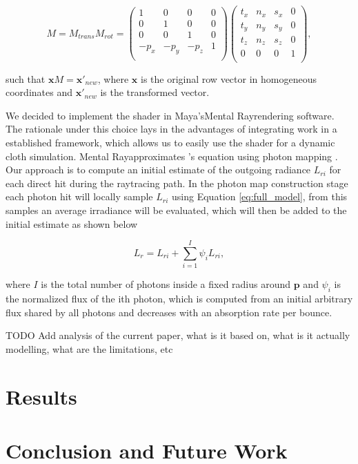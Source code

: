 \documentclass[12pt]{article}
\begin{document}
\begin{equation}
M = M_{trans}M_{rot} =
\begin{pmatrix}
1 & 0 & 0 & 0 \\
0 & 1 & 0 & 0 \\
0 & 0 & 1 & 0 \\
-p_x & -p_y & -p_z & 1 \\
\end{pmatrix}
\begin{pmatrix}
t_x & n_x & s_x & 0 \\
t_y & n_y & s_y & 0 \\
t_z & n_z & s_z & 0 \\
0 & 0 & 0 & 1 \\
\end{pmatrix},
\end{equation}

such that $\mathbf{x}M=\mathbf{x}'_{new}$, where $\mathbf{x}$ is the original row vector in homogeneous coordinates and $\mathbf{x}'_{new}$ is the transformed vector.

We decided to implement the shader in Maya's\texttrademark Mental Ray\texttrademark rendering software.
The rationale under this choice lays in the advantages of integrating work in a established framework, which allows us to easily use the shader for a dynamic cloth simulation.
Mental Ray\texttrademark approximates \citeauthor{Kajiya1986}'s equation \cite{Kajiya1986} using photon mapping \cite{Jensen1996}.
Our approach is to compute an initial estimate of the outgoing radiance $L_{ri}$ for each direct hit during the raytracing path.
In the photon map construction stage each photon hit will locally sample $L_{ri}$ using Equation \ref{eq:full_model}, from this samples an average irradiance will be evaluated, which will then be added to the initial estimate as shown below

\begin{equation}
L_r = L_{ri} + \sum_{i = 1}^{I} \psi_i L_{ri},
\end{equation}

where $I$ is the total number of photons inside a fixed radius around $\mathbf{p}$ and $\psi_i$ is the normalized flux of the ith photon, which is computed from an initial arbitrary flux shared by all photons and decreases with an absorption rate per bounce.

TODO Add analysis of the current paper, what is it based on, what is it actually modelling, what are the limitations, etc

\section{Results}

\section{Conclusion and Future Work}



\end{document}
